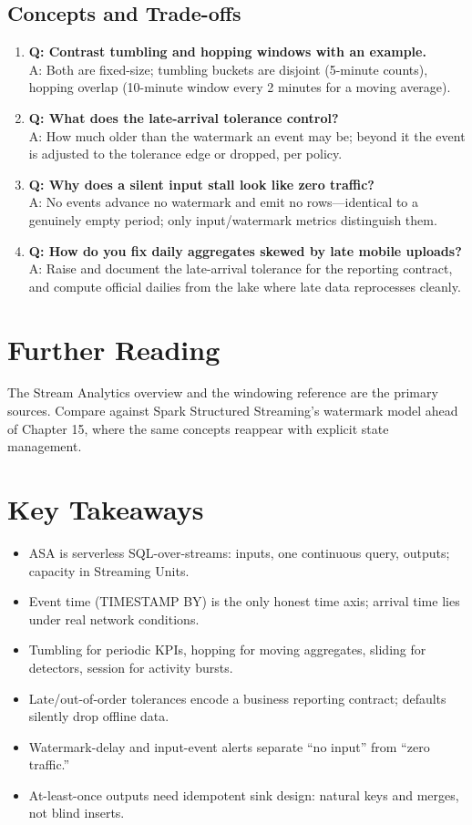 \subsection{Concepts and Trade-offs}
\begin{enumerate}
    \item \textbf{Q: Contrast tumbling and hopping windows with an example.}\\
    A: Both are fixed-size; tumbling buckets are disjoint (5-minute counts), hopping overlap (10-minute window every 2 minutes for a moving average).
    \item \textbf{Q: What does the late-arrival tolerance control?}\\
    A: How much older than the watermark an event may be; beyond it the event is adjusted to the tolerance edge or dropped, per policy.
    \item \textbf{Q: Why does a silent input stall look like zero traffic?}\\
    A: No events advance no watermark and emit no rows---identical to a genuinely empty period; only input/watermark metrics distinguish them.
    \item \textbf{Q: How do you fix daily aggregates skewed by late mobile uploads?}\\
    A: Raise and document the late-arrival tolerance for the reporting contract, and compute official dailies from the lake where late data reprocesses cleanly.
\end{enumerate}

\section{Further Reading}
The Stream Analytics overview \cite{microsoft2025asa} and the windowing reference \cite{microsoft2025asaWindowing} are the primary sources. Compare against Spark Structured Streaming's watermark model \cite{apache2025structuredStreaming} ahead of Chapter 15, where the same concepts reappear with explicit state management.

\section*{Key Takeaways}
\begin{itemize}
    \item ASA is serverless SQL-over-streams: inputs, one continuous query, outputs; capacity in Streaming Units.
    \item Event time (TIMESTAMP BY) is the only honest time axis; arrival time lies under real network conditions.
    \item Tumbling for periodic KPIs, hopping for moving aggregates, sliding for detectors, session for activity bursts.
    \item Late/out-of-order tolerances encode a business reporting contract; defaults silently drop offline data.
    \item Watermark-delay and input-event alerts separate ``no input'' from ``zero traffic.''
    \item At-least-once outputs need idempotent sink design: natural keys and merges, not blind inserts.
\end{itemize}

